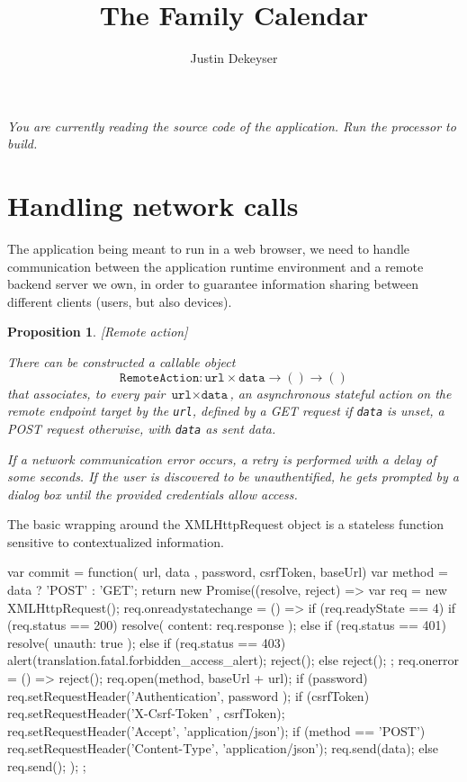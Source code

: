 \documentclass[12pt,a4paper]{article}
\author{Justin Dekeyser}
\title{The Family Calendar}
\newtheorem{proposition}{Proposition}
\newcommand{\word}[1]{\texttt{#1}}
\newcommand{\focusConcern}[2]{}
\begin{document}
\maketitle

\begin{flushright}\it
You are currently reading the source code of the application.\linebreak
Run the processor to build.
\end{flushright}

\section{Handling network calls}

The application being meant to run in a web browser, we need to handle
communication between the application runtime environment and a remote backend
server we own, in order to guarantee information sharing between different
clients (users, but also devices).

\begin{proposition}\label{remote_action_existence}[Remote action]
\focusConcern{RemoteAction}{fo}
There can be constructed a callable object
	\[ \word{RemoteAction}: \word{url}\times\word{data}\to ()\to () \]
that associates, to every pair $\word{url}\times\word{data}$,
an asynchronous stateful action on the remote endpoint target by the
\word{url}, defined by a GET request
if \word{data} is unset, a POST request otherwise, with \word{data} as sent data.

If a network communication error occurs, a retry is performed with
a delay of some seconds. If the user is discovered to be unauthentified,
he gets prompted by a dialog box until the provided credentials allow access.
\end{proposition}

The basic wrapping around the XMLHttpRequest object
is a stateless function sensitive to contextualized information.

\begin{code}
var commit = function({ url, data }, password, csrfToken, baseUrl) {
  var method = data ? 'POST' : 'GET';
  return new Promise((resolve, reject) => {
    var req = new XMLHttpRequest();
    req.onreadystatechange = () => {
      if (req.readyState == 4) {
        if (req.status == 200)
          resolve({ content: req.response });
        else if (req.status == 401)
          resolve({ unauth: true });
        else if (req.status == 403) {
          alert(translation.fatal.forbidden_access_alert);
          reject();
        } else reject();
      }
    };
    req.onerror = () => reject();
    req.open(method, baseUrl + url);
    if (password)  req.setRequestHeader('Authentication', password );
    if (csrfToken) req.setRequestHeader('X-Csrf-Token'  , csrfToken);
    req.setRequestHeader('Accept', 'application/json');
    if (method == 'POST') {
      req.setRequestHeader('Content-Type', 'application/json');
      req.send(data);
    } else req.send();
  });
};
\end{code}
\end{document}
